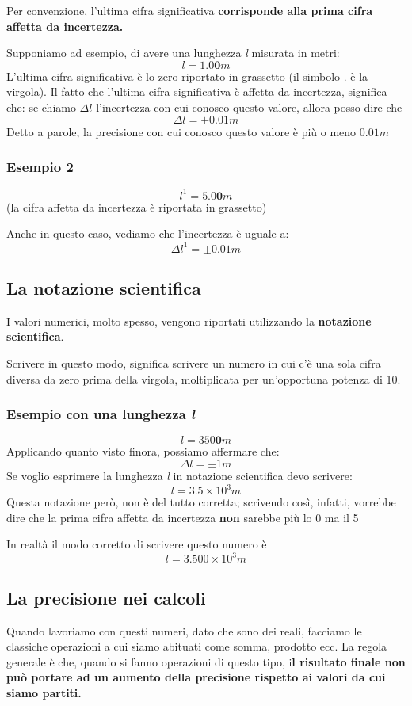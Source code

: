 Per convenzione, l'ultima cifra significativa \textbf{corrisponde alla prima cifra affetta da incertezza.}

Supponiamo ad esempio, di avere una lunghezza  \textit{l} misurata in metri:
$$ l = 1.0\textbf{0} m $$ 
L'ultima cifra significativa è lo zero riportato in grassetto (il simbolo .  è la virgola). 
Il fatto che l'ultima cifra significativa è affetta da incertezza, significa che:
se chiamo $\Delta l$ l'incertezza con cui conosco questo valore, allora posso dire che 
$$\Delta l =  \pm 0.01m$$
Detto a parole, la precisione con cui conosco questo valore è più o meno $0.01m$

\subsubsection{Esempio 2}
$$ l^{1} = 5.0\textbf{0} m $$
 (la cifra affetta da incertezza è riportata in grassetto)
 
 Anche in questo caso, vediamo che l'incertezza è uguale a:
 $$ \Delta l^{1} = \pm 0.01m $$
 
 \subsection{La notazione scientifica}
 I valori numerici,  molto spesso, vengono riportati utilizzando la \textbf{notazione scientifica}. 
 
 Scrivere in questo modo, significa scrivere un numero in cui c'è una sola cifra diversa da zero prima della virgola, moltiplicata per un'opportuna potenza di 10.
 
 \subsubsection{Esempio con una lunghezza \textit{l}} 
 $$ l = 350\textbf{0}m$$
 Applicando quanto visto finora, possiamo affermare che:
 $$\Delta l = \pm 1m$$
 Se voglio esprimere la lunghezza \textit{l} in notazione scientifica devo scrivere:
 $$ l = 3.5 \times 10^{3}m$$
 Questa notazione però, non è del tutto corretta; scrivendo così,  infatti, vorrebbe dire che la prima cifra affetta da incertezza \textbf{non} sarebbe più lo 0 ma il 5
 
 In realtà il modo corretto di scrivere questo numero è
 $$ l = 3.500 \times  10^{3} m$$
 
\subsection{La precisione nei calcoli}
Quando lavoriamo con questi numeri, dato che sono dei reali, facciamo le classiche operazioni a cui siamo abituati come somma, prodotto ecc. La regola generale è che, quando si fanno operazioni di questo tipo, i\textbf{l risultato finale non può portare ad un aumento della precisione rispetto ai valori da cui siamo partiti.}

